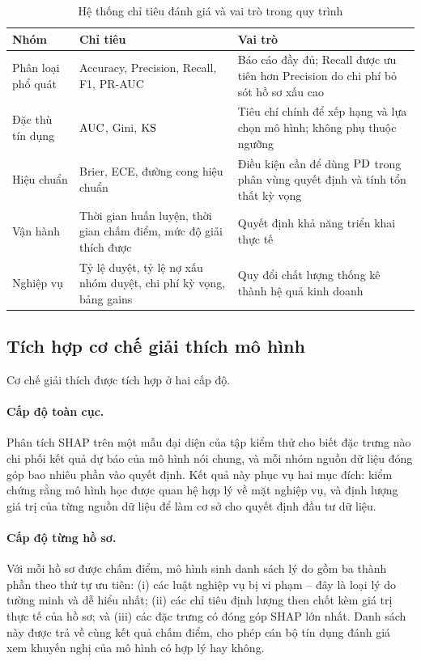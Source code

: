 \begin{table}[htbp]
\centering
\caption{Hệ thống chỉ tiêu đánh giá và vai trò trong quy trình}
\label{tab:metrics-design}
\small
\begin{tabular}{@{}L{2.4cm}L{3.4cm}L{6.6cm}@{}}
\toprule
\textbf{Nhóm} & \textbf{Chỉ tiêu} & \textbf{Vai trò} \\
\midrule
Phân loại phổ quát & Accuracy, Precision, Recall, F1, PR-AUC &
Báo cáo đầy đủ; Recall được ưu tiên hơn Precision do chi phí bỏ sót hồ sơ xấu cao
\\[2pt]
Đặc thù tín dụng & $\mathrm{AUC}$, Gini, $\mathrm{KS}$ &
Tiêu chí chính để xếp hạng và lựa chọn mô hình; không phụ thuộc ngưỡng \\[2pt]
Hiệu chuẩn & Brier, ECE, đường cong hiệu chuẩn &
Điều kiện cần để dùng $\mathrm{PD}$ trong phân vùng quyết định và tính tổn thất kỳ vọng
\\[2pt]
Vận hành & Thời gian huấn luyện, thời gian chấm điểm, mức độ giải thích được &
Quyết định khả năng triển khai thực tế \\[2pt]
Nghiệp vụ & Tỷ lệ duyệt, tỷ lệ nợ xấu nhóm duyệt, chi phí kỳ vọng, bảng gains &
Quy đổi chất lượng thống kê thành hệ quả kinh doanh \\
\bottomrule
\end{tabular}
\end{table}

\subsection{Tích hợp cơ chế giải thích mô hình}
\label{subsec:tich-hop-giai-thich}

Cơ chế giải thích được tích hợp ở hai cấp độ.

\paragraph{Cấp độ toàn cục.} Phân tích SHAP trên một mẫu đại diện của tập kiểm
thử cho biết đặc trưng nào chi phối kết quả dự báo của mô hình nói chung, và mỗi
nhóm nguồn dữ liệu đóng góp bao nhiêu phần vào quyết định. Kết quả này phục vụ
hai mục đích: kiểm chứng rằng mô hình học được quan hệ hợp lý về mặt nghiệp vụ,
và định lượng giá trị của từng nguồn dữ liệu để làm cơ sở cho quyết định đầu tư
dữ liệu.

\paragraph{Cấp độ từng hồ sơ.} Với mỗi hồ sơ được chấm điểm, mô hình sinh danh
sách lý do gồm ba thành phần theo thứ tự ưu tiên: (i) các luật nghiệp vụ bị vi
phạm -- đây là loại lý do tường minh và dễ hiểu nhất; (ii) các chỉ tiêu định
lượng then chốt kèm giá trị thực tế của hồ sơ; và (iii) các đặc trưng có đóng góp
SHAP lớn nhất. Danh sách này được trả về cùng kết quả chấm điểm, cho phép cán bộ
tín dụng đánh giá xem khuyến nghị của mô hình có hợp lý hay không.

